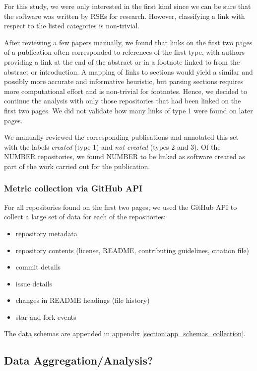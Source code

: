 \documentclass[10pt,a4paper]{scrartcl}
\begin{document}
For this study, we were only interested in the first kind since we can be sure that the software was written by RSEs for research.
However, classifying a link with respect to the listed categories is non-trivial.

After reviewing a few papers manually, we found that links on the first two pages of a publication often corresponded to references of the first type,
with authors providing a link at the end of the abstract or in a footnote linked to from the abstract or introduction.
A mapping of links to sections would yield a similar and possibly more accurate and informative heuristic,
but parsing sections requires more computational effort and is non-trivial for footnotes.
Hence, we decided to continue the analysis with only those repositories that had been linked on the first two pages.
We did not validate how many links of type 1 were found on later pages.

We manually reviewed the corresponding publications and annotated this set with the labels \textit{created} (type 1) and \textit{not created} (types 2 and 3).
Of the NUMBER repositories, we found NUMBER to be linked as software created as part of the work carried out for the publication.

\subsubsection*{Metric collection via GitHub API}

For all repositories found on the first two pages, we used the GitHub API to collect a large set of data for each of the repositories:

\begin{itemize}
    \item repository metadata
    \item repository contents (license, README, contributing guidelines, citation file)
    \item commit details
    \item issue details
    \item changes in README headings (file history)
    \item star and fork events
\end{itemize}

The data schemas are appended in appendix \ref{section:app_schemas_collection}.

\subsection*{Data Aggregation/Analysis?}
\end{document}
